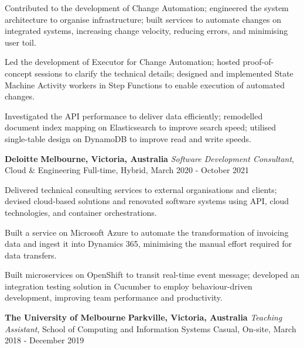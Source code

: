 \documentclass{cv}
\begin{document}
\begin{list}{}{\setlength{\leftmargin}{0pt}}
\begin{list}{\raisebox{2.0pt}{\tiny$\bullet$}\space}{\setlength{\leftmargin}{11.2pt}}
        \item Contributed to the development of Change Automation; engineered the system architecture to organise infrastructure; built services to automate changes on integrated systems, increasing change velocity, reducing errors, and minimising user toil.
        \item Led the development of Executor for Change Automation; hosted proof-of-concept sessions to clarify the technical details; designed and implemented State Machine Activity workers in Step Functions to enable execution of automated changes.
        \item Investigated the API performance to deliver data efficiently; remodelled document index mapping on Elasticsearch to improve search speed; utilised single-table design on DynamoDB to improve read and write speeds.
    \end{list}
\item
    \textbf{Deloitte} \hfill \textbf{Melbourne, Victoria, Australia}%
    \vspace{1.0pt} \newline 
    {\textit{Software Development Consultant}, Cloud \& Engineering} \hfill {Full-time, Hybrid, March 2020 - October 2021}%
    \begin{list}{\raisebox{2.0pt}{\tiny$\bullet$}\space}{\setlength{\leftmargin}{11.2pt}}
        \itemsep -4.0pt \vspace{-4.0pt}
        \item Delivered technical consulting services to external organisations and clients; devised cloud-based solutions and renovated software systems using API, cloud technologies, and container orchestrations.
        \item Built a service on Microsoft Azure to automate the transformation of invoicing data and ingest it into Dynamics 365, minimising the manual effort required for data transfers.
        \item Built microservices on OpenShift to transit real-time event message; developed an integration testing solution in Cucumber to employ behaviour-driven development, improving team performance and productivity.
    \end{list}
\item
    \textbf{The University of Melbourne} \hfill \textbf{Parkville, Victoria, Australia}%
    \vspace{1.0pt} \newline 
    {\textit{Teaching Assistant}, School of Computing and Information Systems} \hfill {Casual, On-site, March 2018 - December 2019}%

\end{list}
\end{document}
